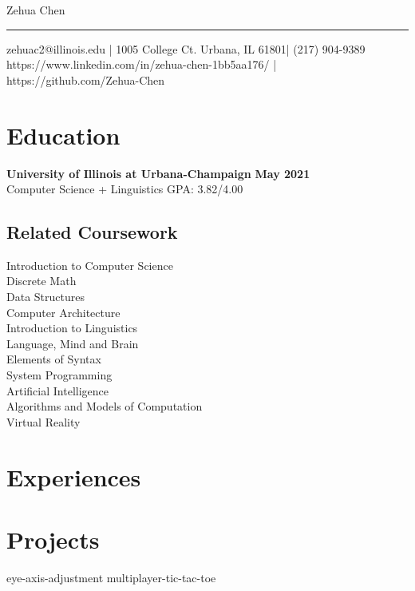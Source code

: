 \documentclass[10pt, letterpaper]{article}
\begin{document}
  \begin{center}
    {\LARGE Zehua Chen} \\
    \rule{\textwidth}{1pt}
    zehuac2@illinois.edu | 1005 College Ct. Urbana, IL 61801| (217) 904-9389 \\
    https://www.linkedin.com/in/zehua-chen-1bb5aa176/ | https://github.com/Zehua-Chen
  \end{center}

  \section{Education}
  {\large\textbf{University of Illinois at Urbana-Champaign}} \hfill {\large\textbf{May 2021}} \\
  {Computer Science + Linguistics} \hfill {GPA: 3.82/4.00}

  \subsection{Related Coursework}

  \vspace{0pt}

  \begin{multicols}{3}
    Introduction to Computer Science \\
    Discrete Math \\
    Data Structures \\
    Computer Architecture \\
    Introduction to Linguistics \\
    Language, Mind and Brain \\
    Elements of Syntax \\
    System Programming \\
    Artificial Intelligence \\
    Algorithms and Models of Computation \\
    Virtual Reality
  \end{multicols}

  \section{Experiences}
  
  
  

  \section{Projects}
  {eye-axis-adjustment}
  {multiplayer-tic-tac-toe}
  
\end{document}
